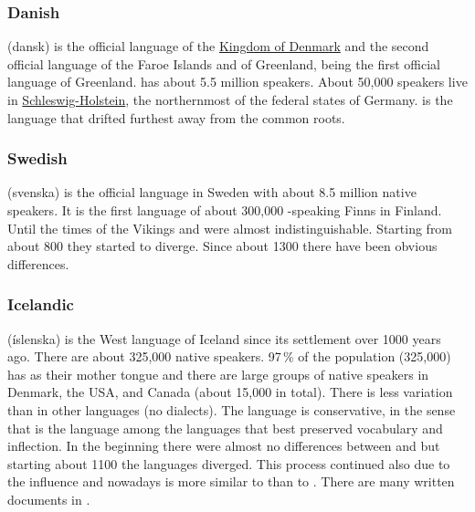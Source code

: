 \subsubsection{Danish}

 (dansk) is the official language of the
\href{https://en.wikipedia.org/wiki/Denmark}{Kingdom of Denmark} and the second official language of the
Faroe Islands and of Greenland,  being the first official language of
Greenland.  has about 5.5 million speakers. About 50,000 speakers live in \href{https://en.wikipedia.org/wiki/Schleswig-Holstein}{Schleswig-Holstein}, the northernmost of the federal states of Germany.
 is the  language that drifted furthest away from the common  roots.


\subsubsection{Swedish}

 (svenska) is the official language in Sweden with about 8.5 million native speakers. It is
the first language of about 300,000 -speaking Finns in Finland. Until the times of the
Vikings  and  were almost indistinguishable. Starting from about 800 they started to
diverge. Since about 1300 there have been obvious differences.



\subsubsection{Icelandic}


 (íslenska) is the West  language of Iceland since its settlement over 1000 years ago. 
There are about 325,000 native speakers. 97\,\% of the  population (325,000) has  as their
mother tongue and there are large groups of native speakers in Denmark, the USA, and Canada
(about 15,000 in total). 
There is less variation than in other  languages (no dialects). 
The language is conservative, in the sense that 
is the language among the  languages that best preserved  vocabulary and inflection.
In the beginning there were almost no differences between  and  but
starting about 1100 the languages diverged. This process continued also due to the 
influence and nowadays  is more similar to  than to . There are many written documents in .

